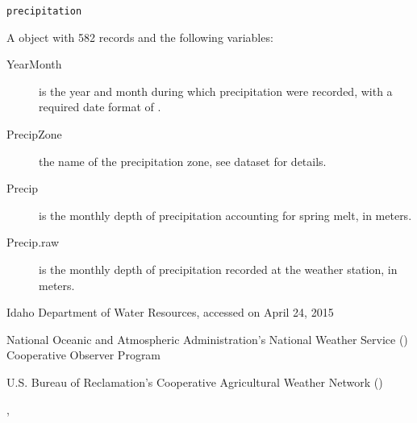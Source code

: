 \documentclass[a4paper]{book}
\begin{document}
%
\begin{Usage}
\begin{verbatim}
precipitation
\end{verbatim}
\end{Usage}
%
\begin{Format}
A  object with 582 records and the following variables:
\begin{description}

\item[YearMonth] is the year and month during which precipitation were recorded, with a required date format of .
\item[PrecipZone] the name of the precipitation zone, see  dataset for details.
\item[Precip] is the monthly depth of precipitation accounting for spring melt, in meters.
\item[Precip.raw] is the monthly depth of precipitation recorded at the weather station, in meters.

\end{description}

\end{Format}
%
\begin{Source}\relax
Idaho Department of Water Resources, accessed on April 24, 2015
\end{Source}
%
\begin{References}\relax
National Oceanic and Atmospheric Administration's National Weather Service () Cooperative Observer Program

U.S. Bureau of Reclamation's Cooperative Agricultural Weather Network ()
\end{References}
%
\begin{SeeAlso}\relax
{}, 
\end{SeeAlso}
%
\begin{Examples}
\end{Examples}
\end{document}
